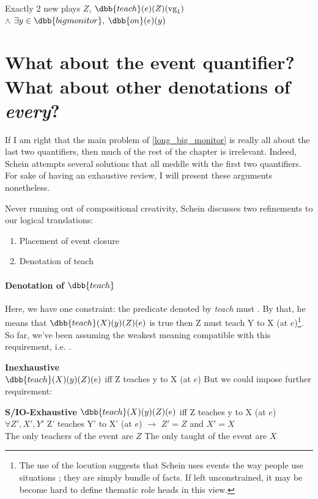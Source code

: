 \ex
\textsf{Exactly 2 new plays} $Z$, $\dbb{teach}(e)(Z)(\text{vg}_{1})$\\
$\wedge$ $\exists y\in\dbb{big monitor},$ $\dbb{on}(e)(y)$
\xe
%

\section{What about the event quantifier? What about other denotations of \emph{every}?}
If I am right that the main problem of \cref{long_big_monitor} is really all about the last two quantifiers, then much of the rest of the chapter is irrelevant. Indeed, Schein attempts several solutions that all meddle with the first two quantifiers. For sake of having an exhaustive review, I will present these arguments nonetheless.


Never running out of compositional creativity, Schein discusses two refinements to our logical translations:

\begin{enumerate}
\item 
Placement of event closure

\item 
Denotation of teach
\end{enumerate}

\paragraph{Denotation of $\dbb{teach}$} Here, we have one constraint: the predicate denoted by \emph{teach} must . By that, he means that $\dbb{teach}(X)(y)(Z)(e)$ is true then Z must teach Y to X (at $e$)\footnote{The use of the locution  suggests that Schein uses events the way people use situations ; they are simply bundle of facts. If left unconstrained, it may be become hard to define thematic role heads in this view.}. So far, we've been assuming the weakest meaning  compatible with this requirement, i.e. \cnextx. 


\pex
\a \textbf{Inexhaustive}\\
$\dbb{teach}(X)(y)(Z)(e)$ iff Z teaches y to X (at $e$)
\a 
\xe
%
But we could impose further requirement:

\pex \textbf{S/IO-Exhaustive}
\a 
$\dbb{teach}(X)(y)(Z)(e)$ iff Z teaches y to X (at $e$)\\
$\forall Z', X', Y'$ Z' teaches Y' to X' (at $e$) $\rightarrow$ $Z'=Z$ and $X'=X$\\
\a 
The only teachers of the event are $Z$
The only taught of the event are $X$
\xe
%

